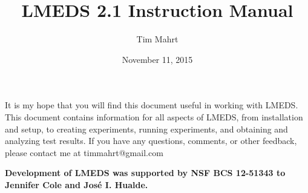 \documentclass[12pt, oneside]{scrbook}   	%
\title{LMEDS 2.1 Instruction Manual}
\author{Tim Mahrt}
\date{November 11, 2015}
\begin{document}
\maketitle

\newpage

\paragraph{}

It is my hope that you will find this document useful in working with LMEDS. This document contains information for all aspects of LMEDS, from installation and setup, to creating experiments, running experiments, and obtaining and analyzing test results.  If you have any questions, comments, or other feedback, please contact me at timmahrt@gmail.com

\vfill

\begin{tcolorbox}[breakable,colback=white,colframe=green,width=\dimexpr\textwidth+12mm\relax,enlarge left by=-6mm]

\textbf{Development of LMEDS was supported by NSF BCS 12-51343 to Jennifer Cole and José I. Hualde.}

\end{tcolorbox}

\tableofcontents

\newpage







\end{document}
